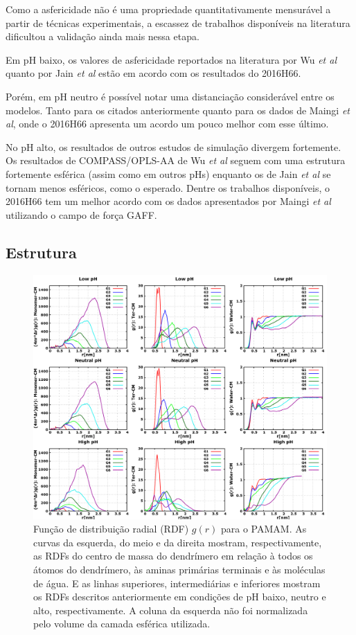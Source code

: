 Como a asfericidade não é uma propriedade quantitativamente mensurável a partir de técnicas experimentais, a escassez de trabalhos disponíveis na literatura dificultou a validação ainda mais nessa etapa.

Em pH baixo, os valores de asfericidade reportados na literatura por Wu \textit{et al}\cite{Wu2012} quanto por Jain \textit{et al}\cite{Jain2013} estão em acordo com os resultados do 2016H66\cite{Horta2016}.

Porém, em pH neutro é possível notar uma distanciação considerável entre os modelos.
Tanto para os citados anteriormente quanto para os dados de Maingi \textit{et al}\cite{Maingi2012}, onde o 2016H66\cite{Horta2016} apresenta um acordo um pouco melhor com esse último.

No pH alto, os resultados de outros estudos de simulação divergem fortemente.
Os resultados de COMPASS/OPLS-AA de Wu \textit{et al}\cite{Wu2010} seguem com uma estrutura fortemente esférica (assim como em outros pHs) enquanto os de Jain \textit{et al}\cite{Jain2013} se tornam menos esféricos, como o esperado.
Dentre os trabalhos disponíveis, o 2016H66\cite{Horta2016} tem um melhor acordo com os dados apresentados por Maingi \textit{et al}\cite{Maingi2012} utilizando o campo de força GAFF\cite{Wang2004}.


\subsection{Estrutura}\label{PPIEstrutura}

\begin{figure}[ht!]
\centering
\includegraphics[width=\textwidth]{images/PPIRDF.png}
\caption{Função de distribuição radial (RDF) $g(r)$ para o PAMAM. As curvas da esquerda, do meio e da direita mostram, respectivamente, as RDFs do centro de massa do dendrímero em relação à todos os átomos do dendrímero, às aminas primárias terminais e às moléculas de água. E as linhas superiores, intermediárias e inferiores mostram os RDFs descritos anteriormente em condições de pH baixo, neutro e alto, respectivamente. A coluna da esquerda não foi normalizada pelo volume da camada esférica utilizada.}
\label{fig:PPIRDF}
\end{figure}

